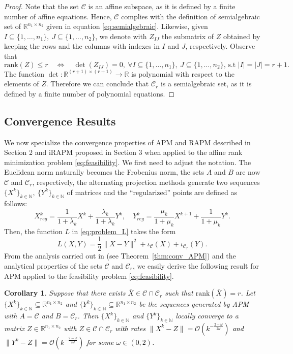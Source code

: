 \documentclass[pdflatex,sn-mathphys-num]{sn-jnl}
\numberwithin{equation}{section}%
\def\R{\mathbb{R}}
\newcommand{\rank}[1]{\textrm{rank}(#1)}
\newcommand{\Xck}{{X_{reg}^k}}
\newcommand{\Yck}{{Y_{reg}^k}}
\newcommand{\setRank}{{\mathcal{C}_r}}
\newcommand{\setNorm}{{\mathcal{C} }}
\newcommand{\REV}[1]{\textcolor{black}{#1}}
\theoremstyle{thmstyleone}%
\newtheorem{corollary}[theorem]{Corollary}%
\theoremstyle{thmstyletwo}%
\theoremstyle{thmstylethree}%
\begin{document}
\begin{proof}
Note that the set $\setNorm$ is an affine subspace, as it is defined by a finite number of affine equations. Hence, $\setNorm$ complies with the definition of semialgebraic set of $\R^{n_1\times n_2}$ given in equation \eqref{eq:semialgebraic}.
Likewise,  {given $I\subseteq \{1,\ldots,n_1\}, \ J\subseteq \{1,\ldots,n_2\}$, we denote with $Z_{IJ}$ the submatrix of $Z$ obtained by keeping the rows and the columns with indexes in $I$ and $J$, respectively.} Observe that 
$$
    \rank Z\leq r \quad\Leftrightarrow \quad \det(Z_{IJ})=0, \ \forall I\subseteq \{1,\ldots,n_1\}, \ J\subseteq \{1,\ldots,n_2\}, \,\mbox{s.t } |I|=|J|=r+1. 
$$
The function $\det:\mathbb{R}^{(r+1)\times (r+1)}\rightarrow \mathbb{R}$ is polynomial with respect to the elements of $Z$. Therefore we can conclude that $\mathcal{C}_r$ is a semialgebraic set, as it is defined by a finite number of polynomial equations.
\end{proof}

\subsection{Convergence Results}
We now specialize the convergence properties of {APM and RAPM} described in Section 2 and {iRAPM proposed in Section 3} when applied to the affine rank minimization problem \eqref{eq:feasibility}. We first need to adjust the notation. {The Euclidean norm naturally becomes the Frobenius norm,} the sets $A$ and $B$ are now $\setNorm$ and $\setRank$, respectively, the alternating projection methods generate two sequences $\{X^k\}_{k\in\mathbb{N}}, \ \{Y^k\}_{k\in\mathbb{N}}$ of matrices and the ``regularized'' points are defined as follows:
\begin{equation}\label{eq:Ykreg}
    \Xck = \frac{1}{1 + \lambda_k} X^k + \frac{\lambda_k}{1 + \lambda_k} Y^k,  \quad \Yck = \frac{\mu_k}{1 + \mu_k} X^{k+1} + \frac{1}{1 + \mu_k} Y^k.
\end{equation}
Then, the function $L$ in \eqref{eq:problem_L} takes the form
\[
    L(X,Y) = \frac{1}{2} \| X-Y \|^2 + \iota_\setNorm (X) + \iota_\setRank (Y).
\]
{From the analysis carried out in \cite{Noll-etal-2016} (see Theorem~\ref{thm:conv_APM}) and the analytical properties of the sets $\mathcal{C}$ and $\mathcal{C}_r$,} we easily derive the following result for APM applied to the feasibility problem \eqref{eq:feasibility}.

\begin{corollary}\label{th:APM_MC}
    {Suppose that there exists $\bar{X}\in\setNorm \cap \setRank$ such that $\rank{\bar{X}}=r$}. Let $\{X^k\}_{k\in\mathbb{N}}\subseteq \R^{n_1\times n_2}$ and $\{Y^k\}_{k\in\mathbb{N}}\subseteq \R^{n_1\times n_2}$ be the sequences generated by APM with $A=\setNorm$ and $B=\setRank$. Then $\{X^k\}_{k\in\mathbb{N}}$ and $\{Y^k\}_{k\in\mathbb{N}}$ locally converge to a matrix $Z\in\R^{n_1\times n_2}$ with $Z\in \setNorm \cap \setRank $ \REV{with rates $\|X^k-Z\|=\mathcal{O}(k^{-\frac{2-\omega}{2\omega}})$ and $\|Y^k-Z\|=\mathcal{O}(k^{-\frac{2-\omega}{2\omega}})$ for some $\omega\in (0,2)$.} 
\end{corollary}
\end{document}
